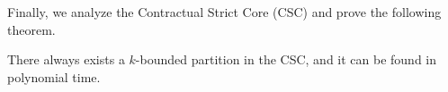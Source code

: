 \documentclass[sigconf]{aamas}
\begin{document}
    
    

Finally, we analyze the Contractual Strict Core (CSC) and prove the following theorem. %
%
 \begin{theorem}
There always exists a $k$-bounded partition in the CSC, and it can be found in polynomial time.
\end{theorem}

\end{document}

